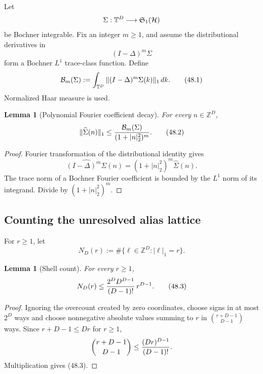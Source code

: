 \documentclass[11pt]{article}
\newtheorem{lemma}[theorem]{Lemma}
\theoremstyle{remark}
\begin{document}
Let
\[
 \Sigma:{\mathbb T}^D\longrightarrow{\mathfrak S}_1({\cal H})
\]
be Bochner integrable.  Fix an integer \(m\geq1\), and assume the
distributional derivatives in
\[
 (I-\Delta)^m\Sigma
\]
form a Bochner \(L^1\) trace-class function.  Define
\begin{equation}
 {\cal B}_m(\Sigma)
 :=
 \int_{{\mathbb T}^D}
 \|(I-\Delta)^m\Sigma(k)\|_1\,dk.                \tag{48.1}
\end{equation}
Normalized Haar measure is used.

\begin{lemma}[Polynomial Fourier coefficient decay]
\label{lem:v12v48-coefficients}
For every \(n\in\mathbb Z^D\),
\begin{equation}
 \|\widehat\Sigma(n)\|_1
 \leq
 {{\cal B}_m(\Sigma)\over(1+|n|_2^2)^m}.          \tag{48.2}
\end{equation}
\end{lemma}

\begin{proof}
Fourier transformation of the distributional identity gives
\[
 \widehat{(I-\Delta)^m\Sigma}(n)
 =
 (1+|n|_2^2)^m\widehat\Sigma(n).
\]
The trace norm of a Bochner Fourier coefficient is bounded by the
\(L^1\) norm of its integrand.  Divide by
\((1+|n|_2^2)^m\).
\end{proof}

\subsection{Counting the unresolved alias lattice}

For \(r\geq1\), let
\[
 N_D(r):=\#\{\ell\in\mathbb Z^D:|\ell|_1=r\}.
\]

\begin{lemma}[Shell count]
\label{lem:v12v48-shell-count}
For every \(r\geq1\),
\begin{equation}
 N_D(r)
 \leq
 {2^DD^{D-1}\over(D-1)!}\,r^{D-1}.               \tag{48.3}
\end{equation}
\end{lemma}

\begin{proof}
Ignoring the overcount created by zero coordinates, choose signs in
at most \(2^D\) ways and choose nonnegative absolute values summing
to \(r\) in
\(\binom{r+D-1}{D-1}\) ways.  Since
\(r+D-1\leq Dr\) for \(r\geq1\),
\[
 \binom{r+D-1}{D-1}
 \leq{(Dr)^{D-1}\over(D-1)!}.
\]
Multiplication gives (48.3).
\end{proof}
\end{document}
